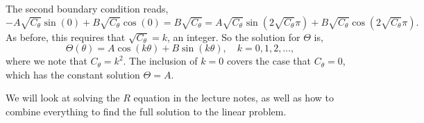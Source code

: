 \documentclass[a4paper,12pt]{article}
\begin{document}
\begin{enumerate}
\begin{enumerate}
{    The second boundary condition reads,
    $$
    -A\sqrt{C_\theta}\sin(0) + B \sqrt{C_\theta}\cos(0) = B\sqrt{C_\theta} = A\sqrt{C_\theta}\sin\left(2\sqrt{C_\theta} \pi\right) + B \sqrt{C_\theta}\cos\left(2\sqrt{C_\theta} \pi\right).
    $$
    As before, this requires that $\sqrt{C_\theta} = k$, an integer. So the solution for $\Theta$ is,
    $$
    \Theta(\theta) = A\cos(k \theta) + B \sin(k \theta), \quad k=0,1,2,\dots,
    $$
    where we note that $C_\theta = k^2$. The inclusion of $k=0$ covers the case that $C_\theta=0$, which has the constant solution $\Theta =A$.
    }
\end{enumerate}
We will look at solving the $R$ equation in the lecture notes, as well as how to combine everything to find the full solution to the linear problem.
\end{enumerate}

    
    
\end{document}
